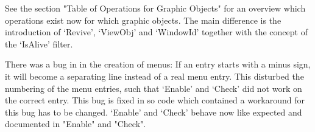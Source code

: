 See the section "Table of Operations for Graphic Objects" for an overview
which operations exist now for which graphic objects. The main difference
is the introduction of `Revive', `ViewObj' and `WindowId' together with the 
concept of the `IsAlive' filter.

There was a bug in {} in the creation of menus: If an entry starts
with a minus sign, it will become a separating line instead of a real menu
entry. This disturbed the numbering of the menu entries, such that `Enable' 
and `Check' did not work on the correct entry. This bug is fixed in
{} so code which contained a workaround for this bug has to be
changed. `Enable' and `Check' behave now like expected and documented in
"Enable" and "Check".

